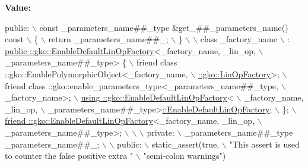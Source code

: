 {\bfseries Value\+:}
\begin{DoxyCode}
\textcolor{keyword}{public}:                                                                      \(\backslash\)
    const \_parameters\_name##\_type &get\_##\_parameters\_name() const            \(\backslash\)
    \{                                                                        \(\backslash\)
        return \_parameters\_name##\_;                                          \(\backslash\)
    \}                                                                        \(\backslash\)
                                                                             \(\backslash\)
    class \_factory\_name                                                      \(\backslash\)
        : \hyperlink{group__LinOp_ga24628d477cba68b31cea690572c51912}{public ::gko::EnableDefaultLinOpFactory}<\_factory\_name, 
      \_lin\_op,    \(\backslash\)
                                                  \_parameters\_name##\_type> \{ \(\backslash\)
        friend class ::gko::EnablePolymorphicObject<\_factory\_name,           \(\backslash\)
                                                    \hyperlink{classgko_1_1LinOpFactory}{::gko::LinOpFactory}>;    \(\backslash\)
        friend class ::gko::enable\_parameters\_type<\_parameters\_name##\_type,  \(\backslash\)
                                                   \_factory\_name>;           \hyperlink{group__LinOp_ga24628d477cba68b31cea690572c51912}{\(\backslash\)}
\hyperlink{group__LinOp_ga24628d477cba68b31cea690572c51912}{        using ::gko::EnableDefaultLinOpFactory}<              
                      \(\backslash\)
            \_factory\_name, \_lin\_op,                                          \(\backslash\)
            \_parameters\_name##\_type>\hyperlink{group__LinOp_ga24628d477cba68b31cea690572c51912}{::EnableDefaultLinOpFactory};             \(\backslash\)
    \};                                                                       \hyperlink{group__LinOp_ga24628d477cba68b31cea690572c51912}{\(\backslash\)}
\hyperlink{group__LinOp_ga24628d477cba68b31cea690572c51912}{    friend ::gko::EnableDefaultLinOpFactory}<\_factory\_name, 
      \_lin\_op,          \(\backslash\)
                                            \_parameters\_name##\_type>;        \(\backslash\)
                                                                             \(\backslash\)
                                                                             \(\backslash\)
private:                                                                     \(\backslash\)
    \_parameters\_name##\_type \_parameters\_name##\_;                             \(\backslash\)
                                                                             \(\backslash\)
public:                                                                      \(\backslash\)
    static\_assert(\textcolor{keyword}{true},                                                      \(\backslash\)
                  \textcolor{stringliteral}{"This assert is used to counter the false positive extra "} \(\backslash\)
                  \textcolor{stringliteral}{"semi-colon warnings"})
\end{DoxyCode}


